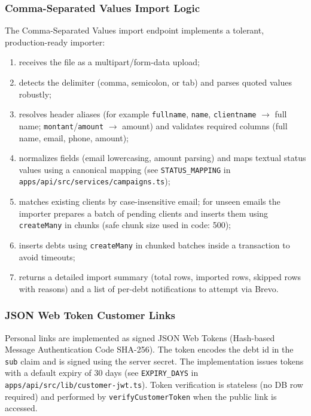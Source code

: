 \documentclass[12pt,a4paper]{report}
\begin{document}
\subsubsection{Comma-Separated Values Import Logic}

The Comma-Separated Values import endpoint implements a tolerant, production-ready importer:
\begin{enumerate}
  \item receives the file as a multipart/form-data upload;
  \item detects the delimiter (comma, semicolon, or tab) and parses quoted values robustly;
  \item resolves header aliases (for example \texttt{fullname}, \texttt{name}, \texttt{clientname} $\to$ full name; \texttt{montant}/\texttt{amount} $\to$ amount) and validates required columns (full name, email, phone, amount);
  \item normalizes fields (email lowercasing, amount parsing) and maps textual status values using a canonical mapping (see \texttt{STATUS\_MAPPING} in \texttt{apps/api/src/services/campaigns.ts});
  \item matches existing clients by case-insensitive email; for unseen emails the importer prepares a batch of pending clients and inserts them using \texttt{createMany} in chunks (safe chunk size used in code: 500);
  \item inserts debts using \texttt{createMany} in chunked batches inside a transaction to avoid timeouts;
  \item returns a detailed import summary (total rows, imported rows, skipped rows with reasons) and a list of per-debt notifications to attempt via Brevo.
\end{enumerate}

\subsubsection{JSON Web Token Customer Links}

Personal links are implemented as signed JSON Web Tokens (Hash-based Message Authentication Code SHA-256). The token
encodes the debt id in the \texttt{sub} claim and is signed using the server secret.
The implementation issues tokens with a default expiry of 30 days (see
\texttt{EXPIRY\_DAYS} in \texttt{apps/api/src/lib/customer-jwt.ts}). Token verification is
stateless (no DB row required) and performed by \texttt{verifyCustomerToken} when the
public link is accessed.
\end{document}
